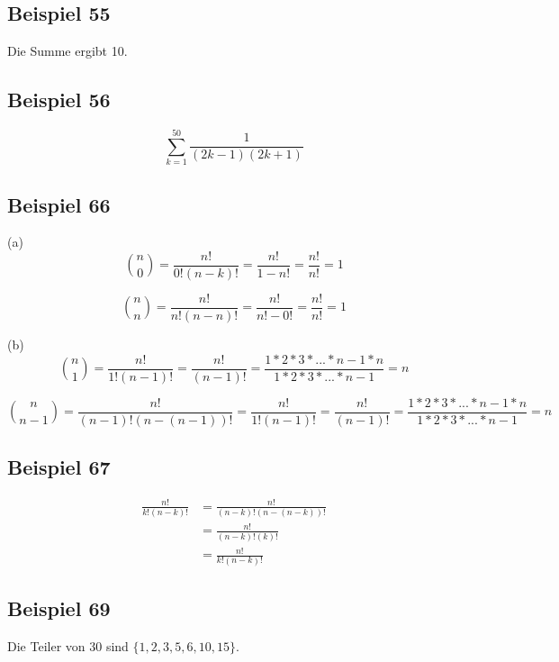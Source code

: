 \documentclass[12pt, a4paper, oneside]{article}
\begin{document}
\subsection{Beispiel 55}
Die Summe ergibt 10.

\subsection{Beispiel 56}
\begin{equation*}
  \sum_{k=1}^{50} \frac{1}{(2k - 1) (2k + 1)}
\end{equation*}

\subsection{Beispiel 66}
(a)
\begin{equation*}
  \binom{n}{0} = \frac{n!}{0!(n - k)!} = \frac{n!}{1 - n!} = \frac{n!}{n!} = 1
\end{equation*}

\begin{equation*}
  \binom{n}{n} = \frac{n!}{n!(n - n)!} = \frac{n!}{n! - 0!} = \frac{n!}{n!} = 1
\end{equation*}   

(b)
\begin{equation*}
  \binom{n}{1} = \frac{n!}{1!(n-1)!} = \frac{n!}{(n - 1)!} = \frac{1 * 2 * 3 * ... * n - 1 * n}{1 * 2 * 3 * ... * n - 1} = n
\end{equation*}

\begin{equation*}
  \binom{n}{n - 1} = \frac{n!}{(n - 1)!(n - (n - 1))!} = \frac{n!}{1!(n-1)!} = \frac{n!}{(n - 1)!} = \frac{1 * 2 * 3 * ... * n - 1 * n}{1 * 2 * 3 * ... * n - 1} = n
\end{equation*}

\subsection{Beispiel 67}
\begin{equation*}
  \begin{split}
    \frac{n!}{k!(n-k)!} & = \frac{n!}{(n-k)!(n - (n - k))!} \\
    & = \frac{n!}{(n-k)!(k)!} \\
    & = \frac{n!}{k!(n - k)!}
  \end{split}
\end{equation*}

\subsection{Beispiel 69}
Die Teiler von 30 sind $\{1, 2, 3, 5, 6, 10, 15\}$.
\end{document}
